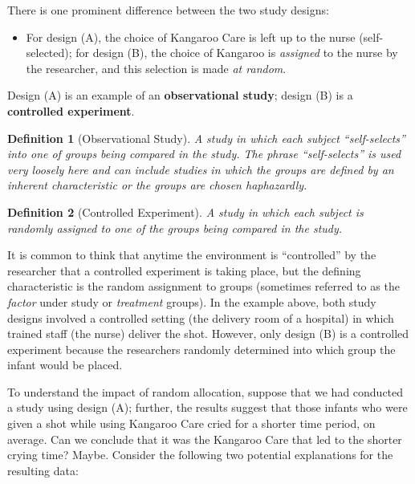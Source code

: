 \documentclass[
]{book}
\providecommand{\tightlist}{%
  \setlength{\itemsep}{0pt}\setlength{\parskip}{0pt}}
\theoremstyle{plain}
\theoremstyle{mydefn}
\newtheorem{definition}{Definition}[chapter]
\theoremstyle{myexmpl}
\theoremstyle{remark}
\begin{document}
There is one prominent difference between the two study designs:

\begin{itemize}
\tightlist
\item
  For design (A), the choice of Kangaroo Care is left up to the nurse (self-selected); for design (B), the choice of Kangaroo is \emph{assigned} to the nurse by the researcher, and this selection is made \emph{at random}.
\end{itemize}

Design (A) is an example of an \textbf{observational study}; design (B) is a \textbf{controlled experiment}.

\begin{definition}[Observational Study]
\protect\hypertarget{def:defn-observational-study}{}{\label{def:defn-observational-study} {} }A study in which each subject ``self-selects'' into one of groups being compared in the study. The phrase ``self-selects'' is used very loosely here and can include studies in which the groups are defined by an inherent characteristic or the groups are chosen haphazardly.
\end{definition}

\begin{definition}[Controlled Experiment]
\protect\hypertarget{def:defn-controlled-experiment}{}{\label{def:defn-controlled-experiment} {} }A study in which each subject is \emph{randomly} assigned to one of the groups being compared in the study.
\end{definition}

It is common to think that anytime the environment is ``controlled'' by the researcher that a controlled experiment is taking place, but the defining characteristic is the random assignment to groups (sometimes referred to as the \emph{factor} under study or \emph{treatment} groups). In the example above, both study designs involved a controlled setting (the delivery room of a hospital) in which trained staff (the nurse) deliver the shot. However, only design (B) is a controlled experiment because the researchers randomly determined into which group the infant would be placed.

To understand the impact of random allocation, suppose that we had conducted a study using design (A); further, the results suggest that those infants who were given a shot while using Kangaroo Care cried for a shorter time period, on average. Can we conclude that it was the Kangaroo Care that led to the shorter crying time? Maybe. Consider the following two potential explanations for the resulting data:
\end{document}
